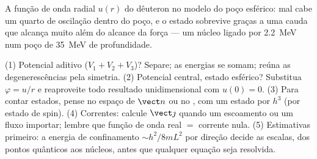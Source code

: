 \begin{omfigure}

{\small A função de onda radial $u(r)$ do dêuteron no modelo do poço
esférico: mal cabe um quarto de oscilação dentro do poço, e o estado
sobrevive graças a uma cauda que alcança muito além do alcance da força
--- um núcleo ligado por \qty{2.2}{MeV} num poço de \qty{35}{MeV} de
profundidade.}
\end{omfigure}

\begin{method}\label{met:b3:schrodinger-three-dimensions:method}
(1) Potencial aditivo ($V_1 + V_2 + V_3$)? Separe; as energias se
somam; reúna as degenerescências pela simetria. (2) Potencial central,
estado esférico? Substitua $\varphi = u/r$ e reaproveite todo resultado
unidimensional com $u(0) = 0$. (3) Para contar estados, pense no espaço
de $\vect n$ ou no , com um estado por $h^3$ (por estado
de spin). (4) Correntes: calcule $\vect\jmath$ quando um escoamento ou
um fluxo importar; lembre que função de onda real $=$ corrente nula.
(5) Estimativas primeiro: a energia de confinamento $\sim h^2/8mL^2$
por direção decide as escalas, dos pontos quânticos aos núcleos, antes
que qualquer equação seja resolvida.
\end{method}

